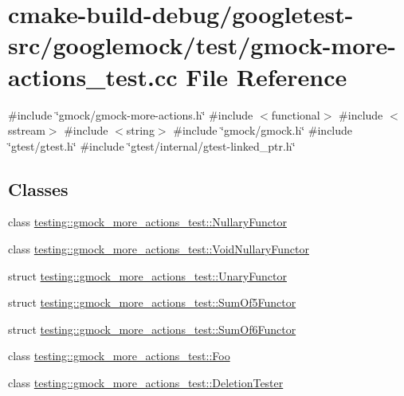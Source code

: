 \hypertarget{gmock-more-actions__test_8cc}{}\section{cmake-\/build-\/debug/googletest-\/src/googlemock/test/gmock-\/more-\/actions\+\_\+test.cc File Reference}
\label{gmock-more-actions__test_8cc}
{\ttfamily \#include \char`\"{}gmock/gmock-\/more-\/actions.\+h\char`\"{}}\newline
{\ttfamily \#include $<$functional$>$}\newline
{\ttfamily \#include $<$sstream$>$}\newline
{\ttfamily \#include $<$string$>$}\newline
{\ttfamily \#include \char`\"{}gmock/gmock.\+h\char`\"{}}\newline
{\ttfamily \#include \char`\"{}gtest/gtest.\+h\char`\"{}}\newline
{\ttfamily \#include \char`\"{}gtest/internal/gtest-\/linked\+\_\+ptr.\+h\char`\"{}}\newline
\subsection*{Classes}
\begin{DoxyCompactItemize}
\item 
class \mbox{\hyperlink{classtesting_1_1gmock__more__actions__test_1_1NullaryFunctor}{testing\+::gmock\+\_\+more\+\_\+actions\+\_\+test\+::\+Nullary\+Functor}}
\item 
class \mbox{\hyperlink{classtesting_1_1gmock__more__actions__test_1_1VoidNullaryFunctor}{testing\+::gmock\+\_\+more\+\_\+actions\+\_\+test\+::\+Void\+Nullary\+Functor}}
\item 
struct \mbox{\hyperlink{structtesting_1_1gmock__more__actions__test_1_1UnaryFunctor}{testing\+::gmock\+\_\+more\+\_\+actions\+\_\+test\+::\+Unary\+Functor}}
\item 
struct \mbox{\hyperlink{structtesting_1_1gmock__more__actions__test_1_1SumOf5Functor}{testing\+::gmock\+\_\+more\+\_\+actions\+\_\+test\+::\+Sum\+Of5\+Functor}}
\item 
struct \mbox{\hyperlink{structtesting_1_1gmock__more__actions__test_1_1SumOf6Functor}{testing\+::gmock\+\_\+more\+\_\+actions\+\_\+test\+::\+Sum\+Of6\+Functor}}
\item 
class \mbox{\hyperlink{classtesting_1_1gmock__more__actions__test_1_1Foo}{testing\+::gmock\+\_\+more\+\_\+actions\+\_\+test\+::\+Foo}}
\item 
class \mbox{\hyperlink{classtesting_1_1gmock__more__actions__test_1_1DeletionTester}{testing\+::gmock\+\_\+more\+\_\+actions\+\_\+test\+::\+Deletion\+Tester}}
\end{DoxyCompactItemize}
